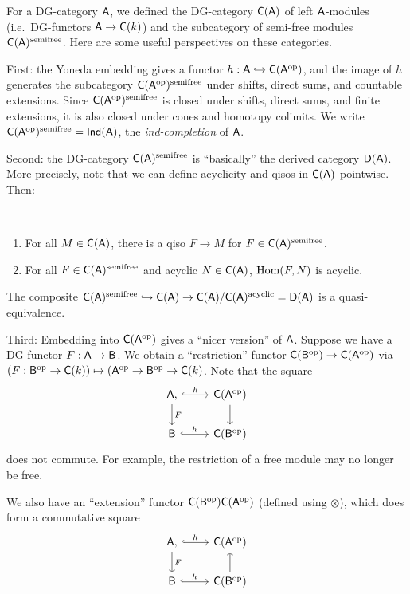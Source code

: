 \documentclass{amsart}
\begin{document}
For a DG-category $\mathsf{A}$, we defined the DG-category $\mathsf{C}(\mathsf{A})$ of left $\mathsf{A}$-modules (i.e.\ DG-functors $\mathsf{A} \to \mathsf{C}(k)$) and the subcategory of semi-free modules $\mathsf{C}(\mathsf{A})^{\mathrm{semifree}}$.
Here are some useful perspectives on these categories.

First: the Yoneda embedding gives a functor $h: \mathsf{A} \hookrightarrow \mathsf{C}(\mathsf{A}^{\mathrm{op}})$, and the image of $h$ generates the subcategory $\mathsf{C}(\mathsf{A}^{\mathrm{op}})^{\mathrm{semifree}}$ under shifts, direct sums, and countable extensions.
Since $\mathsf{C}(\mathsf{A}^{\mathrm{op}})^{\mathrm{semifree}}$ is closed under shifts, direct sums,  and finite extensions, it is also closed under cones and homotopy colimits.
We write $\mathsf{C}(\mathsf{A}^{\mathrm{op}})^{\mathrm{semifree}} = \mathsf{Ind}(\mathsf{A})$, the \emph{ind-completion} of $\mathsf{A}$.

Second: the DG-category $\mathsf{C}(\mathsf{A})^{\mathrm{semifree}}$ is ``basically'' the derived category $\mathsf{D}(\mathsf{A})$.
More precisely, note that we can define acyclicity and qisos in $\mathsf{C}(\mathsf{A})$ pointwise.
Then:

\begin{prop}
	\,
	\begin{enumerate}
		\item For all $M \in \mathsf{C}(\mathsf{A})$, there is a qiso $F \to M$ for $F \in \mathsf{C}(\mathsf{A})^{\mathrm{semifree}}$.
		\item For all $F \in \mathsf{C}(\mathsf{A})^{\mathrm{semifree}}$ and acyclic $N \in \mathsf{C}(\mathsf{A})$, $\operatorname{Hom}(F, N)$ is acyclic.
	\end{enumerate}
\end{prop}

\begin{cor}
	The composite $\mathsf{C}(\mathsf{A})^{\mathrm{semifree}} \hookrightarrow \mathsf{C}(\mathsf{A}) \to \mathsf{C}(\mathsf{A}) / \mathsf{C}(\mathsf{A})^{\mathrm{acyclic}} = \mathsf{D}(\mathsf{A})$ is a quasi-equivalence.
\end{cor}

Third: Embedding into $\mathsf{C}(\mathsf{A}^{\mathrm{op}})$ gives a ``nicer version'' of $\mathsf{A}$.
Suppose we have a DG-functor $F: \mathsf{A} \to \mathsf{B}$.
We obtain a ``restriction'' functor $\mathsf{C}(\mathsf{B}^{\mathrm{op}}) \to \mathsf{C}(\mathsf{A}^{\mathrm{op}})$ via $(F: \mathsf{B}^{\mathrm{op}} \to \mathsf{C}(k)) \mapsto (\mathsf{A}^{\mathrm{op}} \to \mathsf{B}^{\mathrm{op}} \to \mathsf{C}(k)$.
Note that the square
\[
	\begin{tikzcd}
		\Asf \rar[hook, "h"], \dar["F"] & \Csf(\Asf\op) \dar \\
		\Bsf \rar[hook, "h"] & \Csf(\Bsf\op)
	\end{tikzcd}
\]
does not commute.
For example, the restriction of a free module may no longer be free.

We also have an ``extension'' functor $\mathsf{C}(\mathsf{B}^{\mathrm{op}}) \mathsf{C}(\mathsf{A}^{\mathrm{op}})$ (defined using $\otimes$), which does form a commutative square
\[
	\begin{tikzcd}
		\Asf \rar[hook, "h"], \dar["F"] & \Csf(\Asf\op) \\
		\Bsf \rar[hook, "h"] & \Csf(\Bsf\op) \uar
	\end{tikzcd}
\]
\end{document}

